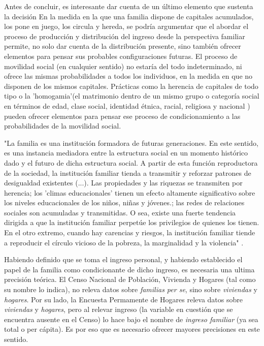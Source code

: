 	
Antes de concluir, es interesante dar cuenta de un último elemento que sustenta la decisión En la medida en la que una familia dispone de capitales acumulados, los pone en juego, los circula y hereda, se podría argumentar que el abordar el proceso de producción y distribución del ingreso desde la perspectiva familiar permite, no solo dar cuenta de la distribución presente, sino también ofrecer elementos para pensar sus probables configuraciones futuras. El proceso de movilidad social (en cualquier sentido) no estaría del todo indeterminado, ni ofrece las mismas probabilidades a todos los individuos, en la medida en que no disponen de los mismos capitales. Prácticas como la herencia de capitales de todo tipo o la 'homogamia'(el matrimonio dentro de un mismo grupo o categoría social en términos de edad, clase social, identidad étnica, racial, religiosa y nacional \cite[p.~31]{jelin}) pueden ofrecer elementos para pensar ese proceso de condicionamiento a las probabilidades de la movilidad social.
	
"La familia es una institución formadora de futuras generaciones. En este sentido, es una instancia mediadora entre la estructura social en un momento histórico dado y el futuro de dicha estructura social. A partir de esta función reproductora de la sociedad, la institución familiar tienda a transmitir y reforzar patrones de desigualdad existentes (...). Las propiedades y las riquezas se transmiten por herencia; los 'climas educacionales' tienen un efecto altamente significativo sobre los niveles educacionales de los niños, niñas y jóvenes.; las redes de relaciones sociales son acumuladas y transmitidas. O sea, existe una fuerte tendencia dirigida a que la institución familiar perpetúe los privilegios de quienes los tienen. En el otro extremo, cuando hay carencias y riesgos, la institución familiar tiende a reproducir el círculo vicioso de la pobreza, la marginalidad y la violencia" \cite[p.~197]{jelin}.
	
Habiendo definido que se toma el ingreso personal, y habiendo establecido el papel de la familia como condicionante de dicho ingreso, es necesaria una ultima precisión teórica. El Censo Nacional de Población, Vivienda y Hogares (tal como su nombre lo indica), no releva datos sobre \textit{familias per se}, sino sobre \textit{viviendas} y \textit{hogares}. Por su lado, la Encuesta Permamente de Hogares releva datos sobre \textit{viviendas} y \textit{hogares}, pero al relevar ingreso (la variable en cuestión que se encuentra ausente en el Censo) lo hace bajo el nombre de \textit{ingreso familiar} (ya sea total o per cápita). Es por eso que es necesario ofrecer mayores precisiones en este sentido. 
	
